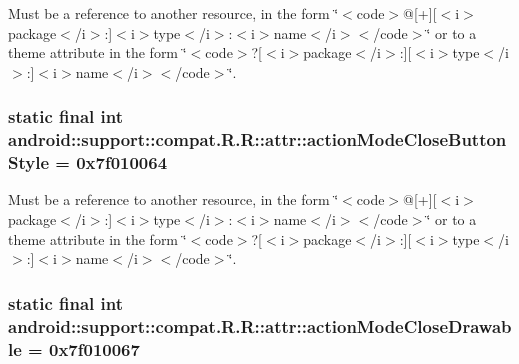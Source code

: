 Must be a reference to another resource, in the form \char`\"{}$<$code$>$@\mbox{[}+\mbox{]}\mbox{[}$<$i$>$package$<$/i$>$:\mbox{]}$<$i$>$type$<$/i$>$:$<$i$>$name$<$/i$>$$<$/code$>$\char`\"{} or to a theme attribute in the form \char`\"{}$<$code$>$?\mbox{[}$<$i$>$package$<$/i$>$:\mbox{]}\mbox{[}$<$i$>$type$<$/i$>$:\mbox{]}$<$i$>$name$<$/i$>$$<$/code$>$\char`\"{}. \hypertarget{classandroid_1_1support_1_1compat_1_1_r_1_1attr_d14ced32834e49715db2a9b3152e8171}{
\subsubsection[{actionModeCloseButtonStyle}]{\setlength{\rightskip}{0pt plus 5cm}static final int android::support::compat.R.R::attr::actionModeCloseButtonStyle = 0x7f010064}}
\label{classandroid_1_1support_1_1compat_1_1_r_1_1attr_d14ced32834e49715db2a9b3152e8171}


Must be a reference to another resource, in the form \char`\"{}$<$code$>$@\mbox{[}+\mbox{]}\mbox{[}$<$i$>$package$<$/i$>$:\mbox{]}$<$i$>$type$<$/i$>$:$<$i$>$name$<$/i$>$$<$/code$>$\char`\"{} or to a theme attribute in the form \char`\"{}$<$code$>$?\mbox{[}$<$i$>$package$<$/i$>$:\mbox{]}\mbox{[}$<$i$>$type$<$/i$>$:\mbox{]}$<$i$>$name$<$/i$>$$<$/code$>$\char`\"{}. \hypertarget{classandroid_1_1support_1_1compat_1_1_r_1_1attr_f1e8aa14b39303fba3d33fd07832ed15}{
\subsubsection[{actionModeCloseDrawable}]{\setlength{\rightskip}{0pt plus 5cm}static final int android::support::compat.R.R::attr::actionModeCloseDrawable = 0x7f010067}}
\label{classandroid_1_1support_1_1compat_1_1_r_1_1attr_f1e8aa14b39303fba3d33fd07832ed15}


